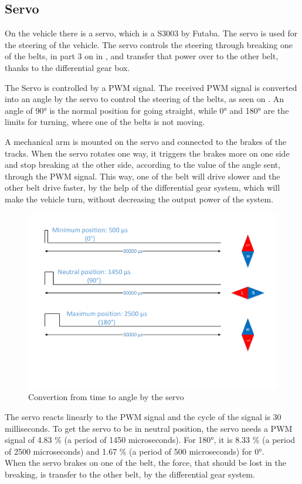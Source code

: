 \subsection{Servo}
On the vehicle there is a servo, which is a S3003 by Futaba. 
The servo is used for the steering of the vehicle. The servo controls the steering through breaking one of the belts, in part 3 on \figref{} in \secref{}, and transfer that power over to the other belt, thanks to the differential gear box.

The Servo is controlled by a PWM signal. The received PWM signal is converted into an angle by the servo to control the steering of the belts, as seen on . An angle of 90° is the normal position for going straight, while 0° and 180° are the limits for turning, where one of the belts is not moving. 

A mechanical arm is mounted on the servo and connected to the brakes of the tracks. When the servo rotates one way, it triggers the brakes more on one side and stop breaking at the other side, according to the value of the angle sent, through the PWM signal. This way, one of the belt will drive slower and the other belt drive faster, by the help of the differential gear system, which will make the vehicle turn, without decreasing the output power of the system.

\begin{figure}[H]
	\centering
	\includegraphics[scale=0.6]{figures/TimeVSangle.pdf}
	\caption{Convertion from time to angle by the servo}
	\label{timeVSangle}
\end{figure}

The servo reacts linearly to the PWM signal and the cycle of the signal is 30 milliseconds. To get the servo to be in neutral position, the servo needs a PWM signal of 4.83 \% (a period of 1450 microseconds). For 180°, it is 8.33 \% (a period of 2500 microseconds) and 1.67 \% (a period of 500 microseconds) for 0°. \\

When the servo brakes on one of the belt, the force, that should be lost in the breaking, is transfer to the other belt, by the differential gear system.